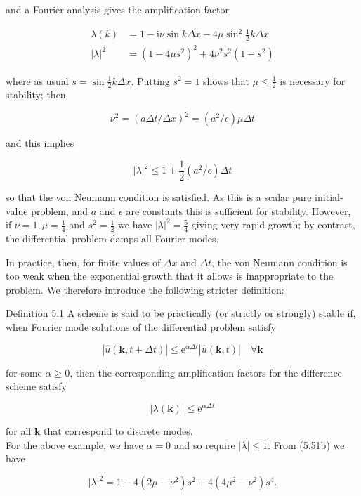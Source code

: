 \documentclass[10pt]{article}
\begin{document}
and a Fourier analysis gives the amplification factor

\[
\begin{aligned}
\lambda(k) & =1-\mathrm{i} \nu \sin k \Delta x-4 \mu \sin ^{2} \frac{1}{2} k \Delta x \\
|\lambda|^{2} & =\left(1-4 \mu s^{2}\right)^{2}+4 \nu^{2} s^{2}\left(1-s^{2}\right)
\end{aligned}
\]

where as usual \(s=\sin \frac{1}{2} k \Delta x\). Putting \(s^{2}=1\) shows that \(\mu \leq \frac{1}{2}\) is necessary for stability; then

\[
\nu^{2}=(a \Delta t / \Delta x)^{2}=\left(a^{2} / \epsilon\right) \mu \Delta t
\]

and this implies

\[
|\lambda|^{2} \leq 1+\frac{1}{2}\left(a^{2} / \epsilon\right) \Delta t
\]

so that the von Neumann condition is satisfied. As this is a scalar pure initial-value problem, and \(a\) and \(\epsilon\) are constants this is sufficient for stability. However, if \(\nu=1, \mu=\frac{1}{4}\) and \(s^{2}=\frac{1}{2}\) we have \(|\lambda|^{2}=\frac{5}{4}\) giving very rapid growth; by contrast, the differential problem damps all Fourier modes.

In practice, then, for finite values of \(\Delta x\) and \(\Delta t\), the von Neumann condition is too weak when the exponential growth that it allows is inappropriate to the problem. We therefore introduce the following stricter definition:

Definition 5.1 A scheme is said to be practically (or strictly or strongly) stable if, when Fourier mode solutions of the differential problem satisfy

\[
|\widehat{u}(\mathbf{k}, t+\Delta t)| \leq \mathrm{e}^{\alpha \Delta t}|\widehat{u}(\mathbf{k}, t)| \quad \forall \mathbf{k}
\]

for some \(\alpha \geq 0\), then the corresponding amplification factors for the difference scheme satisfy

\[
|\lambda(\mathbf{k})| \leq \mathrm{e}^{\alpha \Delta t}
\]

for all \(\mathbf{k}\) that correspond to discrete modes.\\
For the above example, we have \(\alpha=0\) and so require \(|\lambda| \leq 1\). From (5.51b) we have

\[
|\lambda|^{2}=1-4\left(2 \mu-\nu^{2}\right) s^{2}+4\left(4 \mu^{2}-\nu^{2}\right) s^{4} .
\]
\end{document}
